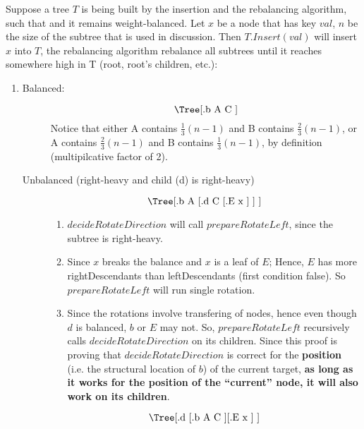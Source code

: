 \documentclass[12pt]{article}
\begin{document}
 Suppose a tree $T$ is being built by the insertion and the rebalancing algorithm, such that and it remains weight-balanced.
Let $x$ be a node that has key $val$, $n$ be the size of the subtree that is used in discussion.
Then $T.Insert(val)$ will insert $x$ into $T$, the rebalancing algorithm rebalance all subtrees until it reaches somewhere high in T (root, root's children, etc.):

\begin{enumerate}
\item
\begin{description}
\item[Balanced:]
\begin{equation}\label{tree:gen-bal}
\text{\Tree[.b A C ]}\\ 
\end{equation}
Notice that either A contains $\frac{1}{3}(n-1)$ and B contains $\frac{2}{3}(n-1)$, or A contains $\frac{2}{3}(n-1)$ and B contains $\frac{1}{3}(n-1)$, by definition (multipilcative factor of 2).\\

\item[Unbalanced (right-heavy and child (d) is right-heavy)]
\begin{equation}\label{tree:id-rr}
\text{\Tree[.b A [.d C [.E x ] ] ] }\\
\end{equation}

\begin{enumerate}
\item $decideRotateDirection$ will call $prepareRotateLeft$, since the subtree is right-heavy.
\item Since $x$ breaks the balance and $x$ is a leaf of $E$; Hence, $E$ has more rightDescendants than leftDescendants (first condition false). So $prepareRotateLeft$ will run single rotation.
\item Since the rotations involve transfering of nodes, hence even though $d$ is balanced, $b$ or $E$ may not.
So, $prepareRotateLeft$ recursively calls $decideRotateDirection$ on its children.
Since this proof is proving that $decideRotateDirection$ is correct for the {\bf position} (i.e. the structural location of $b$) of the current target, {\bf as long as it works for the position of the ``current'' node, it will also work on its children}.
\end{enumerate}
\begin{equation}\label{tree:id-rr-bal}
\text{\Tree[.d [.b A C ] [.E x ] ] }\\
\end{equation}


\end{description}
\end{enumerate}
\end{document}
